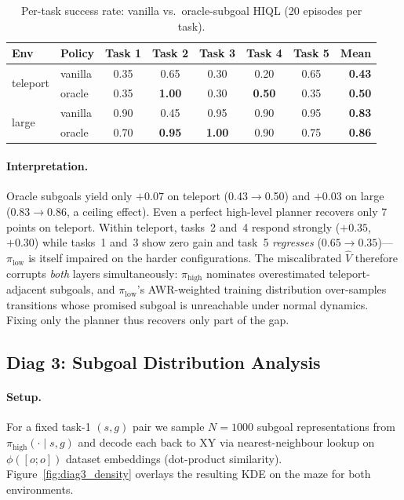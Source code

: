 \documentclass[11pt]{article}
\begin{document}
\begin{table}[h]
  \centering
  \caption{Per-task success rate: vanilla vs.\ oracle-subgoal HIQL
           (20 episodes per task).}
  \label{tab:diag2}
  \small
  \begin{tabular}{llcccccr}
    \toprule
    Env & Policy & Task 1 & Task 2 & Task 3 & Task 4 & Task 5 & \textbf{Mean} \\
    \midrule
    \multirow{2}{*}{teleport}
      & vanilla & 0.35 & 0.65 & 0.30 & 0.20 & 0.65 & \textbf{0.43} \\
      & oracle  & 0.35 & \textbf{1.00} & 0.30 & \textbf{0.50} & 0.35 & \textbf{0.50} \\
    \midrule
    \multirow{2}{*}{large}
      & vanilla & 0.90 & 0.45 & 0.95 & 0.90 & 0.95 & \textbf{0.83} \\
      & oracle  & 0.70 & \textbf{0.95} & \textbf{1.00} & 0.90 & 0.75 & \textbf{0.86} \\
    \bottomrule
  \end{tabular}
\end{table}

\paragraph{Interpretation.}
Oracle subgoals yield only $+0.07$ on teleport (0.43$\to$0.50) and
$+0.03$ on large (0.83$\to$0.86, a ceiling effect).
Even a perfect high-level planner recovers only 7 points on teleport.
Within teleport, tasks~2 and~4 respond strongly ($+0.35$, $+0.30$)
while tasks~1 and~3 show zero gain and task~5 \emph{regresses}
($0.65\to 0.35$)---$\pi_\text{low}$ is itself impaired on the harder
configurations.
The miscalibrated $\hat{V}$ therefore corrupts \emph{both} layers
simultaneously: $\pi_\text{high}$ nominates overestimated
teleport-adjacent subgoals, and $\pi_\text{low}$'s AWR-weighted training
distribution over-samples transitions whose promised subgoal is
unreachable under normal dynamics. Fixing only the planner thus
recovers only part of the gap.

\subsection{Diag 3: Subgoal Distribution Analysis}
\label{subsec:diag3}

\paragraph{Setup.}
For a fixed task-1 $(s,g)$ pair we sample $N = 1000$ subgoal
representations from $\pi_\text{high}(\cdot \mid s, g)$ and decode each
back to XY via nearest-neighbour lookup on $\phi([o;o])$ dataset
embeddings (dot-product similarity).
Figure~\ref{fig:diag3_density} overlays the resulting KDE on the maze
for both environments.
\end{document}
